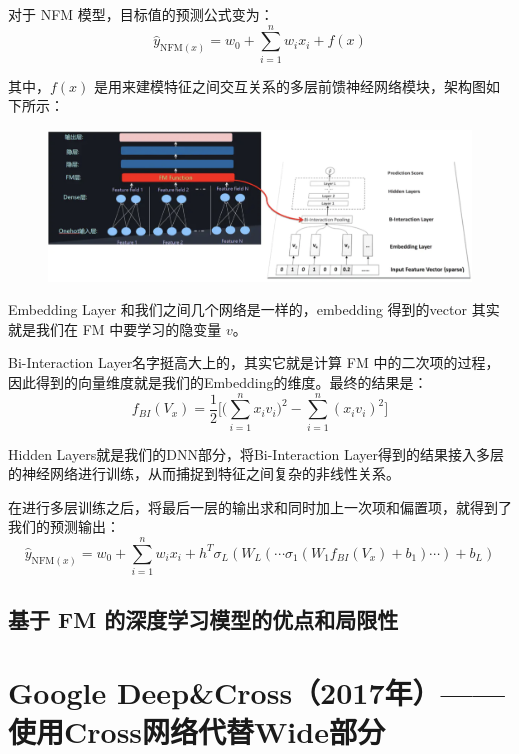 \documentclass[12pt]{article}
\begin{document}
对于 NFM 模型，目标值的预测公式变为：
$$
\hat{y}_{\text{NFM}(x)} = w_0 + \sum_{i=1}^nw_ix_i + f(x)
$$

其中，$f(x)$ 是用来建模特征之间交互关系的多层前馈神经网络模块，架构图如下所示：
\begin{figure}[H]
    \centering
    \includegraphics[width=1\textwidth]{fig/NFM_FM_Detail.png}
\end{figure}

Embedding Layer 和我们之间几个网络是一样的，embedding 得到的vector 其实就是我们在 FM 中要学习的隐变量 $v$。

Bi-Interaction Layer名字挺高大上的，其实它就是计算 FM 中的二次项的过程，因此得到的向量维度就是我们的Embedding的维度。最终的结果是：
$$
f_{BI} (V_x) = \frac{1}{2}\Big[ \Big( \sum_{i=1}^n x_iv_i\Big)^2 - \sum_{i=1}^n(x_iv_i)^2\Big]
$$

Hidden Layers就是我们的DNN部分，将Bi-Interaction Layer得到的结果接入多层的神经网络进行训练，从而捕捉到特征之间复杂的非线性关系。

在进行多层训练之后，将最后一层的输出求和同时加上一次项和偏置项，就得到了我们的预测输出：
$$
\hat{y}_{\text{NFM}(x)} = w_0 + \sum_{i=1}^nw_ix_i + h^T\sigma_L(W_L(\cdots \sigma_1(W_1f_{BI}(V_x)+b_1)\cdots)+b_L)
$$



\subsection{基于 FM 的深度学习模型的优点和局限性}

\section{Google Deep\&Cross（2017年）——使用Cross网络代替Wide部分}
\end{document}
